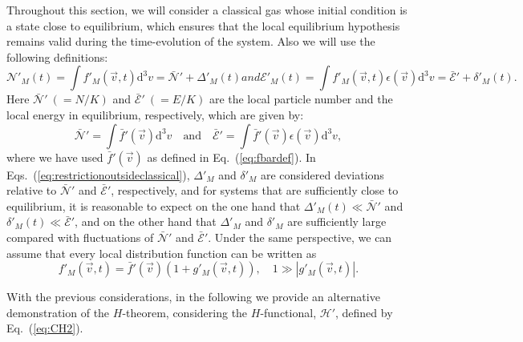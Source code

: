 Throughout this section, we will consider a classical gas
whose initial condition is a state close to equilibrium,
which ensures that the local equilibrium hypothesis remains valid during
the time-evolution of the system.
Also we will use the following definitions:
\begin{subequations}\label{eq:restrictionoutsideclassical}
%
\begin{equation}
      \mathcal{N}'_M(t)=\int f'_{M}(\vec{v},t) \mathrm{d}^{3}v=
      \bar{\mathcal{N}}'+\Delta'_M(t)
\end{equation}
%
and
%
\begin{equation}
      \mathcal{E}'_M(t)=\int f'_{M}(\vec{v},t) \epsilon(\vec{v}) \mathrm{d}^{3}v=
      \bar{\mathcal{E}}'+ \delta'_M(t).
\end{equation}
\end{subequations}
%
Here $\bar {\mathcal{N}}'\ (=N/K)$ and $\bar{\mathcal{E}}'\ (=E/K)$ are
the local particle number and the local energy in equilibrium, respectively, which are given by:
%
    \begin{equation}
      \bar{\mathcal{N}}'=
      \int \bar{f}'(\vec{v}) \mathrm{d}^{3}v\quad\textrm{and} \quad
      \bar{\mathcal{E}}'=
      \int \bar{f}'(\vec{v})\epsilon(\vec{v}) \mathrm{d}^{3}v,
    \end{equation}
where we have used $\bar{f}'(\vec{v})$ as defined in Eq.~(\ref{eq:fbardef}).
In Eqs.~(\ref{eq:restrictionoutsideclassical}), $\Delta'_M$ and $\delta'_M$
are considered deviations relative to
$\bar{\mathcal{N}}'$ and $\bar{\mathcal{E}}'$, respectively, and for systems that are
sufficiently close to equilibrium, it is reasonable to expect on the one hand that
$\Delta'_M(t)\ll\bar{\mathcal{N}}'$ and
$\delta'_M(t)\ll\bar{\mathcal{E}}'$, and on the other hand that $\Delta'_M$ and
$\delta'_M$ are sufficiently large compared with fluctuations of $\bar{\mathcal{N}}'$
and $\bar{\mathcal{E}}'$. Under the same perspective, we can assume that every local
distribution function can be written as
\begin{equation}\label{eq:firstorder}
   f'_{M}(\vec{v},t)=\bar{f}'(\vec{v})(1+g'_{M}(\vec{v},t)),\quad
   1\gg|g'_{M}(\vec{v},t)|.
\end{equation}
%

With the previous considerations, in the following we provide an alternative demonstration
of the $H$-theorem, considering the $H$-functional, $\mathcal{H}'$, defined by Eq.~(\ref{eq:CH2}).


